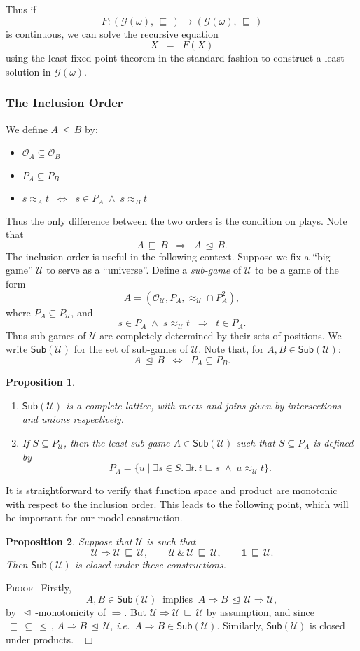 \documentclass[a4paper,11pt]{article}
\newcommand{\gequiv}{\approx}
\newcommand{\UU}{\mathcal{U}}
\newtheorem{proposition}{Proposition}[section]
\newcommand{\GG}[1]{\mathcal{G}(#1)}
\newcommand{\llwith}{\, \& \,}
\newcommand{\domapprox}{\, \sqsubseteq \,}
\newcommand{\ginc}{\, \trianglelefteq \,}
\newcommand{\Occ}{\mathcal{O}}
\newcommand{\SubU}{\mathsf{Sub}(\UU )}
\newcommand{\ie}{\textit{i.e.}\ }
\newenvironment{proof}{\textsc{Proof}\ }{$\;\; \Box$}
\begin{document}
\noindent Thus if
\[ F : (\GG{\omega}, {\domapprox}) \longrightarrow (\GG{\omega},
{\domapprox}) \]
is continuous, we can solve the recursive equation
\[ X \;\; = \;\; F(X) \]
using the least fixed point theorem in the standard fashion to
construct a least solution in $\GG{\omega}$.

\subsubsection{The Inclusion Order}
We define $A \ginc B$ by:
\begin{itemize}
\item $\Occ_A \subseteq \Occ_B$
\item $P_A \subseteq P_B $
\item $s \gequiv_A t \;\; \Longleftrightarrow \;\; s \in P_A \; \wedge \;
  s \gequiv_B t$
\end{itemize}
Thus the only difference between the two orders is the condition
on plays. Note that
\[ A \domapprox B \;\; \Longrightarrow \;\; A \ginc B . \]
The inclusion order is useful in the following context. Suppose we fix
a ``big game'' $\UU$ to serve as a ``universe''. Define a
\emph{sub-game} of $\UU$ to be a game of the form
\[ A = (\Occ_{\UU}, P_A , \gequiv_{\UU} \cap P_A^2 ) , \]
where $P_A \subseteq P_{\UU}$, and
\[ s \in P_A \; \wedge \; s \gequiv_{\UU} t \;\; \Longrightarrow \;\; t \in P_A . \]
Thus sub-games of $\UU$ are completely determined by their sets of
positions. We write $\SubU$ for the set of sub-games of
$\UU$. Note that, for $A, B \in \SubU$:
\[ A \ginc B \;\; \Longleftrightarrow \;\; P_A \subseteq P_B . \]
\begin{proposition}
\label{SubU}
\begin{enumerate}
\item $\SubU$ is a complete lattice, with meets and joins given by
  intersections and unions respectively.
\item If $S \subseteq P_{\UU}$, then the least sub-game $A \in \SubU$
  such that $S \subseteq P_A$ is defined by
\[ P_A = \{ u \mid \exists s \in S. \, \exists t. \, t \sqsubseteq s
\; \wedge \; u \gequiv_{\UU} t \} . \]
\end{enumerate}
\end{proposition}

\noindent It is straightforward to verify that function space and product are
monotonic with respect to the inclusion order. This leads to the
following point, which will be important for our model construction.
\begin{proposition}
\label{Uclos}
Suppose that $\UU$ is such that
\[ \UU \Rightarrow \UU \domapprox \UU, \qquad \UU \llwith \UU \domapprox
\UU , \qquad \mathbf{1} \domapprox \UU . \]
Then $\SubU$ is closed under these constructions.
\end{proposition}
\begin{proof} Firstly,
\[ A, B \in \SubU \;\; \mbox{implies} \;\; A \Rightarrow B
  \ginc \UU \Rightarrow \UU , \]
by $\ginc$-monotonicity of $\Rightarrow$. But $\UU \Rightarrow \UU
\domapprox \UU$ by assumption, and since ${\domapprox} \subseteq
{\ginc}$, $A \Rightarrow B \ginc \UU$, \ie $A \Rightarrow B
\in \SubU$.
Similarly, $\SubU$ is closed under products.
\end{proof}
\end{document}
